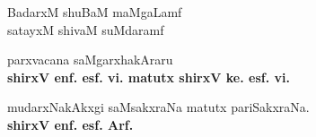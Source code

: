 \bigskip
\begin{center}
BadarxM shuBaM maMgaLamf\\
satayxM shivaM suMdaramf
\end{center}



\begin{flushleft}
parxvacana saMgarxhakAraru\\[4pt]
{\bf shirxV enf. esf. vi. matutx shirxV ke. esf. vi.}
\end{flushleft}

\begin{flushright}
mudarxNakAkxgi saMsakxraNa matutx pariSakxraNa.\\
{\bf shirxV enf. esf. Arf.}
\end{flushright}
